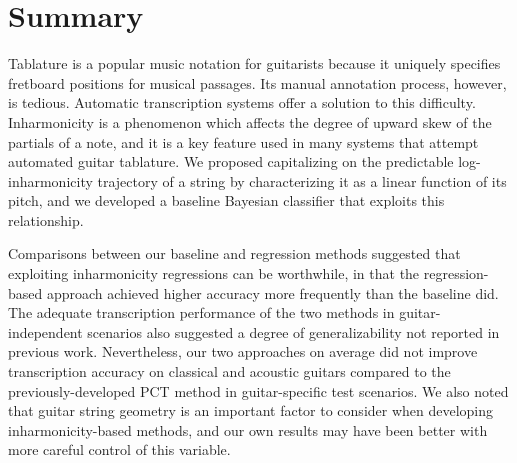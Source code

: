 \documentclass[convention,peer-reviewed]{aesconf}
\begin{document}
\section{Summary} 
Tablature is a popular music notation for guitarists because it uniquely specifies fretboard positions for musical passages. Its manual annotation process, however, is tedious. Automatic transcription systems offer a solution to this difficulty. Inharmonicity is a phenomenon which affects the degree of upward skew of the partials of a note, and it is a key feature used in many systems that attempt automated guitar tablature. We proposed capitalizing on the predictable log-inharmonicity trajectory of a string by characterizing it as a linear function of its pitch, and we developed a baseline Bayesian classifier that exploits this relationship. 

Comparisons between our baseline and regression methods suggested that exploiting inharmonicity regressions can be worthwhile, in that the regression-based approach achieved higher accuracy more frequently than the baseline did. The adequate transcription performance of the two methods in guitar-independent scenarios also suggested a degree of generalizability not reported in previous work. Nevertheless, our two approaches on average did not improve transcription accuracy on classical and acoustic guitars compared to the previously-developed PCT method in guitar-specific test scenarios. We also noted that guitar string geometry is an important factor to consider when developing inharmonicity-based methods, and our own results may have been better with more careful control of this variable.




\end{document}
